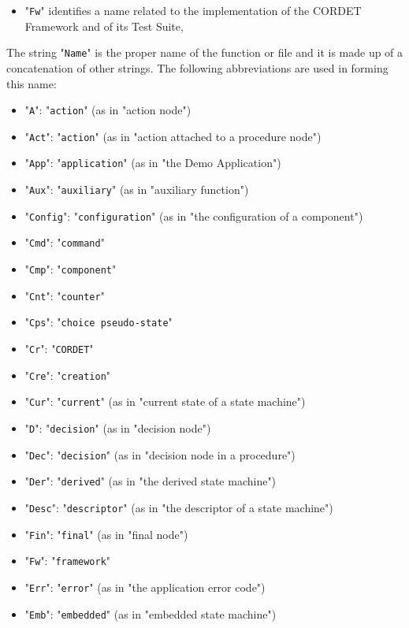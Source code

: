 \documentclass{pnp_article}
\begin{document}
\begin{itemize}
\item "\texttt{Fw}" identifies a name related to the implementation of the CORDET Framework and of its Test Suite, 
\end{itemize}

The string "\texttt{Name}" is the proper name of the function or file and it is made up of a concatenation of other strings. The following abbreviations are used in forming this name:

\begin{itemize}
\item "\texttt{A}": "\texttt{action}" (as in "action node")
\item "\texttt{Act}": "\texttt{action}" (as in "action attached to a procedure node")
\item "\texttt{App}": "\texttt{application}" (as in "the Demo Application")
\item "\texttt{Aux}": "\texttt{auxiliary}" (as in "auxiliary function")
\item "\texttt{Config}": "\texttt{configuration}" (as in "the configuration of a component")
\item "\texttt{Cmd}": "\texttt{command}"
\item "\texttt{Cmp}": "\texttt{component}"
\item "\texttt{Cnt}": "\texttt{counter}"
\item "\texttt{Cps}": "\texttt{choice pseudo-state}"
\item "\texttt{Cr}": "\texttt{CORDET}" 
\item "\texttt{Cre}": "\texttt{creation}" 
\item "\texttt{Cur}": "\texttt{current}" (as in "current state of a state machine")
\item "\texttt{D}": "\texttt{decision}" (as in "decision node")
\item "\texttt{Dec}": "\texttt{decision}" (as in "decision node in a procedure")
\item "\texttt{Der}": "\texttt{derived}" (as in "the derived state machine")
\item "\texttt{Desc}": "\texttt{descriptor}" (as in "the descriptor of a state machine")
\item "\texttt{Fin}": "\texttt{final}" (as in "final node")
\item "\texttt{Fw}": "\texttt{framework}" 
\item "\texttt{Err}": "\texttt{error}" (as in "the application error code")
\item "\texttt{Emb}": "\texttt{embedded}" (as in "embedded state machine")

\end{itemize}
\end{document}
